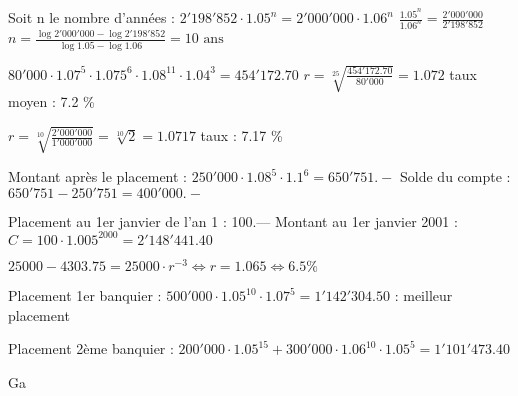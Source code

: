 \begin{solution}
Soit n le nombre d’années :
$2'198'852\cdot {{1.05}^{n}}=2'000'000\cdot {{1.06}^{n}}$	$\frac{{{1.05}^{n}}}{{{1.06}^{n}}}=\frac{2'000'000}{2'198'852}$
$n=\frac{\log 2'000'000-\log 2'198'852}{\log 1.05-\log 1.06}=10\text{ ans}$
\end{solution}

\begin{solution}
$80'000\cdot {{1.07}^{5}}\cdot {{1.075}^{6}}\cdot {{1.08}^{11}}\cdot {{1.04}^{3}}=454'172.70$
$r=\sqrt[25]{\frac{454'172.70}{80'000}}=1.072$  taux moyen : 7.2 \%
\end{solution}

\begin{solution}
$r=\sqrt[10]{\frac{2'000'000}{1'000'000}}=\sqrt[10]{2}=1.0717$   taux : 7.17 \%
\end{solution}

\begin{solution}
Montant après le placement : $250'000\cdot {{1.08}^{5}}\cdot {{1.1}^{6}}=650'751.-$
Solde du compte : $650'751-250'751=400'000.-$
\end{solution}

\begin{solution}
Placement au 1er janvier de l’an 1 : 100.––
Montant au 1er janvier 2001 :$C=100\cdot {{1.005}^{2000}}=2'148'441.40$
\end{solution}

\begin{solution}
$25000-4303.75=25000\cdot {{r}^{-3}}\Leftrightarrow r=1.065\Leftrightarrow 6.5\%$
\end{solution}

\begin{solution}
Placement 1er banquier : $500'000\cdot {{1.05}^{10}}\cdot {{1.07}^{5}}=1'142'304.50$ : meilleur placement

Placement 2ème banquier : $200'000\cdot {{1.05}^{15}}+300'000\cdot {{1.06}^{10}}\cdot {{1.05}^{5}}=1'101'473.40$

Ga\end{solution}

